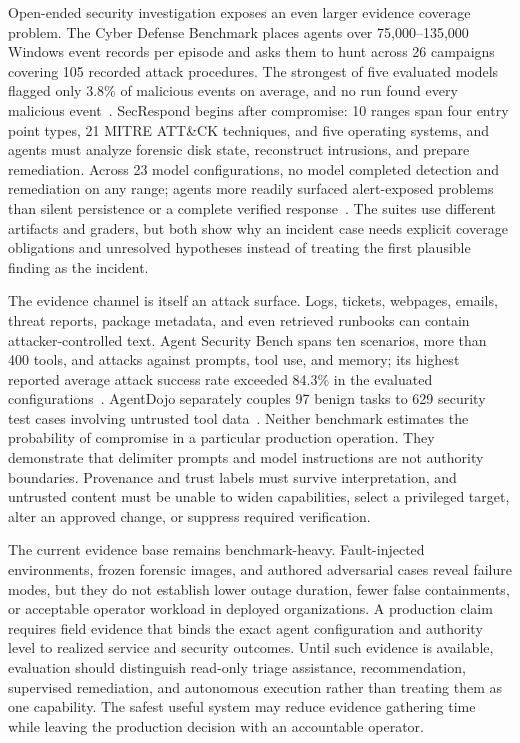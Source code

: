 Open-ended security investigation exposes an even larger evidence coverage problem. The Cyber Defense Benchmark places agents over 75,000--135,000 Windows event records per episode and asks them to hunt across 26 campaigns covering 105 recorded attack procedures. The strongest of five evaluated models flagged only 3.8\% of malicious events on average, and no run found every malicious event~\cite{chona2026cyberdefense}. SecRespond begins after compromise: 10 ranges span four entry point types, 21 MITRE ATT\&CK techniques, and five operating systems, and agents must analyze forensic disk state, reconstruct intrusions, and prepare remediation. Across 23 model configurations, no model completed detection and remediation on any range; agents more readily surfaced alert-exposed problems than silent persistence or a complete verified response~\cite{wang2026secrespond}. The suites use different artifacts and graders, but both show why an incident case needs explicit coverage obligations and unresolved hypotheses instead of treating the first plausible finding as the incident.

The evidence channel is itself an attack surface. Logs, tickets, webpages, emails, threat reports, package metadata, and even retrieved runbooks can contain attacker-controlled text. Agent Security Bench spans ten scenarios, more than 400 tools, and attacks against prompts, tool use, and memory; its highest reported average attack success rate exceeded 84.3\% in the evaluated configurations~\cite{zhang2024agentsecuritybench}. AgentDojo separately couples 97 benign tasks to 629 security test cases involving untrusted tool data~\cite{debenedetti2024agentdojo}. Neither benchmark estimates the probability of compromise in a particular production operation. They demonstrate that delimiter prompts and model instructions are not authority boundaries. Provenance and trust labels must survive interpretation, and untrusted content must be unable to widen capabilities, select a privileged target, alter an approved change, or suppress required verification.

The current evidence base remains benchmark-heavy. Fault-injected environments, frozen forensic images, and authored adversarial cases reveal failure modes, but they do not establish lower outage duration, fewer false containments, or acceptable operator workload in deployed organizations. A production claim requires field evidence that binds the exact agent configuration and authority level to realized service and security outcomes. Until such evidence is available, evaluation should distinguish read-only triage assistance, recommendation, supervised remediation, and autonomous execution rather than treating them as one capability. The safest useful system may reduce evidence gathering time while leaving the production decision with an accountable operator.

